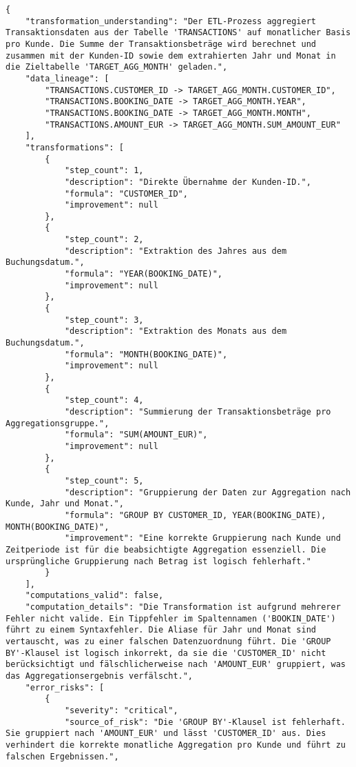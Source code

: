 \begin{lstlisting}[caption={Ausgabe: GEMINI 2.5 Pro Anwendungsfall 1 Hauptdurchlauf},label={gemini_case1_prompt1}]
{
    "transformation_understanding": "Der ETL-Prozess aggregiert Transaktionsdaten aus der Tabelle 'TRANSACTIONS' auf monatlicher Basis pro Kunde. Die Summe der Transaktionsbeträge wird berechnet und zusammen mit der Kunden-ID sowie dem extrahierten Jahr und Monat in die Zieltabelle 'TARGET_AGG_MONTH' geladen.",
    "data_lineage": [
        "TRANSACTIONS.CUSTOMER_ID -> TARGET_AGG_MONTH.CUSTOMER_ID",
        "TRANSACTIONS.BOOKING_DATE -> TARGET_AGG_MONTH.YEAR",
        "TRANSACTIONS.BOOKING_DATE -> TARGET_AGG_MONTH.MONTH",
        "TRANSACTIONS.AMOUNT_EUR -> TARGET_AGG_MONTH.SUM_AMOUNT_EUR"
    ],
    "transformations": [
        {
            "step_count": 1,
            "description": "Direkte Übernahme der Kunden-ID.",
            "formula": "CUSTOMER_ID",
            "improvement": null
        },
        {
            "step_count": 2,
            "description": "Extraktion des Jahres aus dem Buchungsdatum.",
            "formula": "YEAR(BOOKING_DATE)",
            "improvement": null
        },
        {
            "step_count": 3,
            "description": "Extraktion des Monats aus dem Buchungsdatum.",
            "formula": "MONTH(BOOKING_DATE)",
            "improvement": null
        },
        {
            "step_count": 4,
            "description": "Summierung der Transaktionsbeträge pro Aggregationsgruppe.",
            "formula": "SUM(AMOUNT_EUR)",
            "improvement": null
        },
        {
            "step_count": 5,
            "description": "Gruppierung der Daten zur Aggregation nach Kunde, Jahr und Monat.",
            "formula": "GROUP BY CUSTOMER_ID, YEAR(BOOKING_DATE), MONTH(BOOKING_DATE)",
            "improvement": "Eine korrekte Gruppierung nach Kunde und Zeitperiode ist für die beabsichtigte Aggregation essenziell. Die ursprüngliche Gruppierung nach Betrag ist logisch fehlerhaft."
        }
    ],
    "computations_valid": false,
    "computation_details": "Die Transformation ist aufgrund mehrerer Fehler nicht valide. Ein Tippfehler im Spaltennamen ('BOOKIN_DATE') führt zu einem Syntaxfehler. Die Aliase für Jahr und Monat sind vertauscht, was zu einer falschen Datenzuordnung führt. Die 'GROUP BY'-Klausel ist logisch inkorrekt, da sie die 'CUSTOMER_ID' nicht berücksichtigt und fälschlicherweise nach 'AMOUNT_EUR' gruppiert, was das Aggregationsergebnis verfälscht.",
    "error_risks": [
        {
            "severity": "critical",
            "source_of_risk": "Die 'GROUP BY'-Klausel ist fehlerhaft. Sie gruppiert nach 'AMOUNT_EUR' und lässt 'CUSTOMER_ID' aus. Dies verhindert die korrekte monatliche Aggregation pro Kunde und führt zu falschen Ergebnissen.",

\end{lstlisting}

